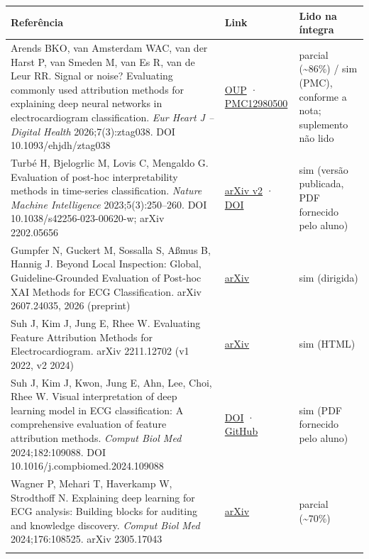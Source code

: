 \documentclass[11pt,a4paper]{article}
\begin{document}
{\scriptsize\setlength{\tabcolsep}{3pt}
\begin{xltabular}{\linewidth}{>{\raggedright\arraybackslash}X>{\raggedright\arraybackslash}X>{\raggedright\arraybackslash}X}
\toprule
\textbf{Referência} & \textbf{Link} & \textbf{Lido na íntegra} \\
\midrule
\endhead
Arends BKO, van Amsterdam WAC, van der Harst P, van Smeden M, van Es R, van de Leur RR. Signal or noise? Evaluating commonly used attribution methods for explaining deep neural networks in electrocardiogram classification. \textit{Eur Heart J – Digital Health} 2026;7(3):ztag038. DOI 10.1093/ehjdh/ztag038 & \href{https://academic.oup.com/ehjdh/article/7/3/ztag038/8512917}{OUP} · \href{https://pmc.ncbi.nlm.nih.gov/articles/PMC12980500/}{PMC12980500} & parcial (\textasciitilde{}86\%) / sim (PMC), conforme a nota; suplemento não lido \\ \addlinespace[1pt]
Turbé H, Bjelogrlic M, Lovis C, Mengaldo G. Evaluation of post-hoc interpretability methods in time-series classification. \textit{Nature Machine Intelligence} 2023;5(3):250–260. DOI 10.1038/s42256-023-00620-w; arXiv 2202.05656 & \href{https://arxiv.org/html/2202.05656v2}{arXiv v2} · \href{https://doi.org/10.1038/s42256-023-00620-w}{DOI} & sim (versão publicada, PDF fornecido pelo aluno) \\ \addlinespace[1pt]
Gumpfer N, Guckert M, Sossalla S, Aßmus B, Hannig J. Beyond Local Inspection: Global, Guideline-Grounded Evaluation of Post-hoc XAI Methods for ECG Classification. arXiv 2607.24035, 2026 (preprint) & \href{https://arxiv.org/abs/2607.24035}{arXiv} & sim (dirigida) \\ \addlinespace[1pt]
Suh J, Kim J, Jung E, Rhee W. Evaluating Feature Attribution Methods for Electrocardiogram. arXiv 2211.12702 (v1 2022, v2 2024) & \href{https://arxiv.org/html/2211.12702}{arXiv} & sim (HTML) \\ \addlinespace[1pt]
Suh J, Kim J, Kwon, Jung E, Ahn, Lee, Choi, Rhee W. Visual interpretation of deep learning model in ECG classification: A comprehensive evaluation of feature attribution methods. \textit{Comput Biol Med} 2024;182:109088. DOI 10.1016/j.compbiomed.2024.109088 & \href{https://doi.org/10.1016/j.compbiomed.2024.109088}{DOI} · \href{https://github.com/SNU-DRL/Attribution-ECG}{GitHub} & sim (PDF fornecido pelo aluno) \\ \addlinespace[1pt]
Wagner P, Mehari T, Haverkamp W, Strodthoff N. Explaining deep learning for ECG analysis: Building blocks for auditing and knowledge discovery. \textit{Comput Biol Med} 2024;176:108525. arXiv 2305.17043 & \href{https://arxiv.org/html/2305.17043v2}{arXiv} & parcial (\textasciitilde{}70\%) \\ \addlinespace[1pt]

\end{xltabular}}
\end{document}
